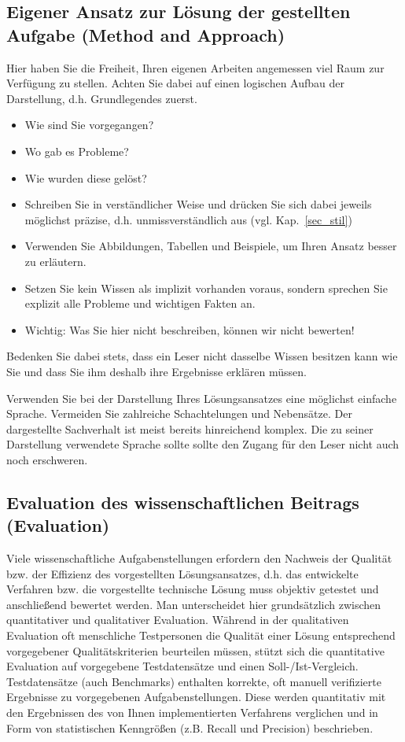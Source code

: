 \subsection{Eigener Ansatz zur Lösung der gestellten Aufgabe (Method and Approach)}
Hier haben Sie die Freiheit, Ihren eigenen Arbeiten angemessen viel Raum zur Verfügung zu stellen.
Achten Sie dabei auf einen logischen Aufbau der Darstellung, d.h. Grundlegendes zuerst.
\begin{itemize}
\item Wie sind Sie vorgegangen?
\item Wo gab es Probleme?
\item Wie wurden diese gelöst?
\item Schreiben Sie in verständlicher Weise und drücken Sie sich dabei jeweils möglichst präzise, d.h. unmissverständlich aus (vgl. Kap.~\ref{sec_stil})
\item Verwenden Sie Abbildungen, Tabellen und Beispiele, um Ihren Ansatz besser zu erläutern.
\item Setzen Sie kein Wissen als implizit vorhanden voraus, sondern sprechen Sie explizit alle Probleme und wichtigen Fakten an.
\item Wichtig: Was Sie hier nicht beschreiben, können wir nicht bewerten!
\end{itemize}
Bedenken Sie dabei stets, dass ein Leser nicht dasselbe Wissen besitzen kann wie Sie und dass Sie ihm deshalb ihre Ergebnisse erklären müssen.

Verwenden Sie bei der Darstellung Ihres Lösungsansatzes eine möglichst einfache Sprache.
Vermeiden Sie zahlreiche Schachtelungen und Nebensätze. Der dargestellte Sachverhalt ist meist bereits hinreichend komplex. 
Die zu seiner Darstellung verwendete Sprache sollte sollte den Zugang für den Leser nicht auch noch erschweren.


\subsection{Evaluation des wissenschaftlichen Beitrags (Evaluation)}
%
Viele wissenschaftliche Aufgabenstellungen erfordern den Nachweis der Qualität bzw. der Effizienz des vorgestellten Lösungsansatzes, d.h. das entwickelte Verfahren bzw. die vorgestellte technische Lösung muss objektiv getestet und anschließend bewertet werden.
Man unterscheidet hier grundsätzlich zwischen quantitativer und qualitativer Evaluation.
Während in der qualitativen Evaluation oft menschliche Testpersonen die Qualität einer Lösung entsprechend vorgegebener Qualitätskriterien beurteilen müssen, stützt sich die quantitative Evaluation auf vorgegebene Testdatensätze und einen Soll-/Ist-Vergleich.
Testdatensätze (auch Benchmarks) enthalten korrekte, oft manuell verifizierte Ergebnisse zu vorgegebenen Aufgabenstellungen.
Diese werden quantitativ mit den Ergebnissen des von Ihnen implementierten Verfahrens verglichen und in Form von statistischen Kenngrößen (z.B. Recall und Precision) beschrieben.

